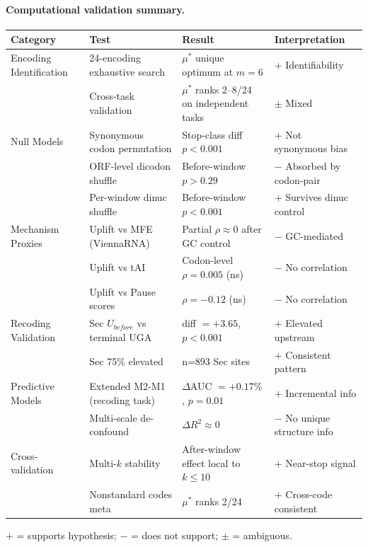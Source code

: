 \paragraph{Computational validation summary.}
\begin{center}
\footnotesize
\begin{tabular}{llll}
\toprule
Category & Test & Result & Interpretation \\
\midrule
Encoding Identification & 24-encoding exhaustive search & $\mu^\ast$ unique optimum at $m=6$ & $+$ Identifiability \\
 & Cross-task validation & $\mu^\ast$ ranks 2--8/24 on independent tasks & $\pm$ Mixed \\
\midrule
Null Models & Synonymous codon permutation & Stop-class diff $p<0.001$ & $+$ Not synonymous bias \\
 & ORF-level dicodon shuffle & Before-window $p>0.29$ & $-$ Absorbed by codon-pair \\
 & Per-window dinuc shuffle & Before-window $p<0.001$ & $+$ Survives dinuc control \\
\midrule
Mechanism Proxies & Uplift vs MFE (ViennaRNA) & Partial $\rho \approx 0$ after GC control & $-$ GC-mediated \\
 & Uplift vs tAI & Codon-level $\rho = 0.005$ (ns) & $-$ No correlation \\
 & Uplift vs Pause scores & $\rho = -0.12$ (ns) & $-$ No correlation \\
\midrule
Recoding Validation & Sec $U_{before}$ vs terminal UGA & diff $= +3.65$, $p < 0.001$ & $+$ Elevated upstream \\
 & Sec 75\% elevated & n=893 Sec sites & $+$ Consistent pattern \\
\midrule
Predictive Models & Extended M2-M1 (recoding task) & $\Delta$AUC $= +0.17\%$, $p = 0.01$ & $+$ Incremental info \\
 & Multi-scale de-confound & $\Delta R^2 \approx 0$ & $-$ No unique structure info \\
\midrule
Cross-validation & Multi-$k$ stability & After-window effect local to $k \leq 10$ & $+$ Near-stop signal \\
 & Nonstandard codes meta & $\mu^\ast$ ranks 2/24 & $+$ Cross-code consistent \\
\bottomrule
\end{tabular}
\end{center}
\footnotesize $+$ = supports hypothesis; $-$ = does not support; $\pm$ = ambiguous.

